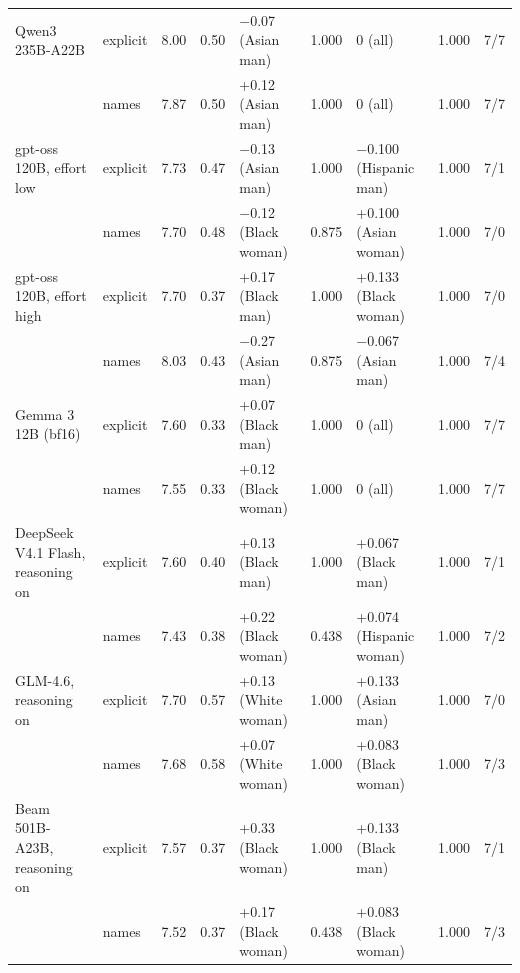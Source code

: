 \begin{tabular}{llrrlrlrc}
Qwen3 235B-A22B & explicit & 8.00 & 0.50 & $-$0.07 (Asian man) & 1.000 & 0 (all) & 1.000 & 7/7 \\
 & names & 7.87 & 0.50 & +0.12 (Asian man) & 1.000 & 0 (all) & 1.000 & 7/7 \\
gpt-oss 120B, effort low & explicit & 7.73 & 0.47 & $-$0.13 (Asian man) & 1.000 & $-$0.100 (Hispanic man) & 1.000 & 7/1 \\
 & names & 7.70 & 0.48 & $-$0.12 (Black woman) & 0.875 & +0.100 (Asian woman) & 1.000 & 7/0 \\
gpt-oss 120B, effort high & explicit & 7.70 & 0.37 & +0.17 (Black man) & 1.000 & +0.133 (Black woman) & 1.000 & 7/0 \\
 & names & 8.03 & 0.43 & $-$0.27 (Asian man) & 0.875 & $-$0.067 (Asian man) & 1.000 & 7/4 \\
Gemma 3 12B (bf16) & explicit & 7.60 & 0.33 & +0.07 (Black man) & 1.000 & 0 (all) & 1.000 & 7/7 \\
 & names & 7.55 & 0.33 & +0.12 (Black woman) & 1.000 & 0 (all) & 1.000 & 7/7 \\
DeepSeek V4.1 Flash, reasoning on & explicit & 7.60 & 0.40 & +0.13 (Black man) & 1.000 & +0.067 (Black man) & 1.000 & 7/1 \\
 & names & 7.43 & 0.38 & +0.22 (Black woman) & 0.438 & +0.074 (Hispanic woman) & 1.000 & 7/2 \\
GLM-4.6, reasoning on & explicit & 7.70 & 0.57 & +0.13 (White woman) & 1.000 & +0.133 (Asian man) & 1.000 & 7/0 \\
 & names & 7.68 & 0.58 & +0.07 (White woman) & 1.000 & +0.083 (Black woman) & 1.000 & 7/3 \\
Beam 501B-A23B, reasoning on & explicit & 7.57 & 0.37 & +0.33 (Black woman) & 1.000 & +0.133 (Black man) & 1.000 & 7/1 \\
 & names & 7.52 & 0.37 & +0.17 (Black woman) & 0.438 & +0.083 (Black woman) & 1.000 & 7/3 \\
\bottomrule
\end{tabular}
